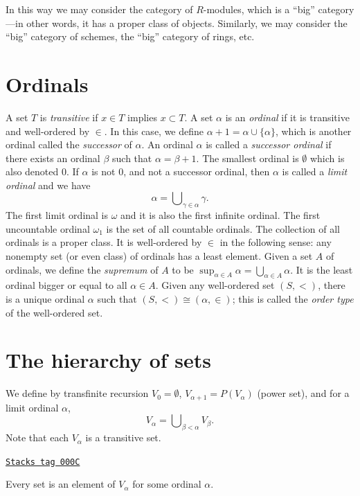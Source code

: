 \medskip\noindent
In this way we may consider the category of $R$-modules,
which is a ``big'' category---in other words, it has a
proper class of objects. Similarly, we may consider
the ``big'' category of schemes, the ``big'' category
of rings, etc.

\section{Ordinals}
\label{sets-section-ordinals}
A set $T$ is {\it transitive} if $x\in T$ implies $x\subset T$.
A set $\alpha$ is an {\it ordinal} if it is transitive and well-ordered
by $\in$. In this case, we define $\alpha + 1 = \alpha \cup \{\alpha\}$,
which is another ordinal called the {\it successor} of $\alpha$.
An ordinal $\alpha$ is called a {\it successor ordinal} if
there exists an ordinal $\beta$ such that $\alpha = \beta + 1$.
The smallest ordinal is $\emptyset$ which is also denoted $0$.
If $\alpha$ is not $0$, and not a successor ordinal, then $\alpha$ is called
a {\it limit ordinal} and we have
$$
\alpha
=
\bigcup\nolimits_{\gamma \in \alpha} \gamma.
$$
The first limit ordinal is $\omega$ and it is also the first
infinite ordinal. The first uncountable ordinal $\omega_1$
is the set of all countable ordinals.
The collection of all ordinals is a proper class.
It is well-ordered by $\in$ in the following sense: any nonempty set
(or even class) of ordinals has a least element.
Given a set $A$ of ordinals, we define the {\it supremum}
of $A$ to be $\sup_{\alpha \in A} \alpha =
\bigcup_{\alpha \in A} \alpha$. It is the least ordinal bigger
or equal to all $\alpha \in A$.
Given any well-ordered set $(S, <)$, there is a unique ordinal
$\alpha$ such that $(S, <) \cong (\alpha, \in)$; this is
called the {\it order type} of the well-ordered set.

\section{The hierarchy of sets}
\label{sets-section-sets-hierarchy}
We define by transfinite recursion $V_0 = \emptyset$,
$V_{\alpha + 1} = P(V_\alpha)$ (power set),
and for a limit ordinal $\alpha$,
$$
V_\alpha = \bigcup\nolimits_{\beta < \alpha} V_\beta.
$$
Note that each $V_\alpha$ is a transitive set.

\begin{lemma}
\label{sets-lemma-axiom-regularity}
\href{https://stacks.math.columbia.edu/tag/000C}{\texttt{Stacks tag 000C}}

Every set is an element of $V_\alpha$ for some ordinal $\alpha$.
\end{lemma}

